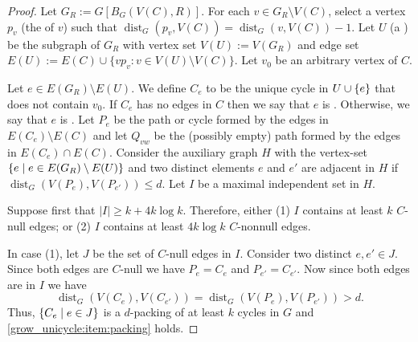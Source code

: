\documentclass{patmorin}
\DeclareMathOperator{\dist}{dist}
\DeclarePairedDelimiter\set{\{}{\}}
\begin{document}
\begin{proof}
  Let $G_{R}:=G[B_G(V(C),R)]$.
  For each $v\in G_{R}\setminus V(C)$, select a vertex $p_v$ (the  of $v$) such that $\dist_G(p_v,V(C))=\dist_G(v,V(C))-1$.
  Let $U$ (a ) be the subgraph of $G_{R}$ with vertex set $V(U):=V(G_{R})$ and edge set $E(U):=E(C)\cup\{vp_v:v\in V(U)\setminus V(C)\}$.  Let $v_0$ be an arbitrary vertex of $C$.

  Let $e\in E(G_{R})\setminus E(U)$.
  We define $C_e$ to be the unique cycle in $U\cup \set{e}$ that does not contain $v_0$.
  If $C_e$ has no edges in $C$ then we say that $e$ is .
  Otherwise, we say that $e$ is .
  Let $P_{e}$ be the path or cycle formed by the edges in $E(C_{e})\setminus E(C)$ and let $Q_{vw}$ be the (possibly empty) path formed by the edges in $E(C_{e})\cap E(C)$.
  Consider the auxiliary graph $H$ with the vertex-set $\set{e\mid e\in E(G_{R})\setminus E(U)}$ and two distinct elements $e$ and $e'$ are adjacent in $H$ if $\dist_G(V(P_{e}),V(P_{e'})) \le d$.  Let $I$ be a maximal independent set in $H$.

  Suppose first that $|I|\ge k+4k\log k$.
  Therefore,
  either (1) $I$ contains at least $k$ $C$-null edges;
  or (2) $I$ contains at least $4k\log k$ $C$-nonnull edges.

  In case (1), let $J$ be the set of $C$-null edges in $I$.
  Consider two distinct $e,e'\in J$.
  Since both edges are $C$-null we have $P_e=C_e$ and $P_{e'}=C_{e'}$.
  Now since both edges are in $I$ we have
  \[
  \dist_G(V(C_e),V(C_{e'}))=\dist_G(V(P_e),V(P_{e'}))>d.
  \]
  Thus, $\set{C_e \mid e\in J}$ is a $d$-packing of at least $k$ cycles in $G$ and \eqref{grow_unicycle:item:packing} holds.


\end{proof}
\end{document}
